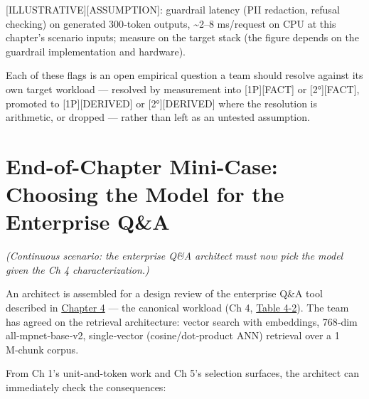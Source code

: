 \mbox{{[}ILLUSTRATIVE{]}}\hspace{0pt}\mbox{{[}ASSUMPTION{]}}: guardrail latency (PII redaction,
refusal checking) on generated 300‑token outputs, \textasciitilde2--8
ms/request on CPU at this chapter's scenario inputs; measure on the
target stack (the figure depends on the guardrail implementation and
hardware).

Each of these flags is an open empirical question a team should resolve
against its own target workload --- resolved by measurement into
\mbox{{[}1P{]}}\hspace{0pt}\mbox{{[}FACT{]}} or \mbox{{[}2°{]}}\hspace{0pt}\mbox{{[}FACT{]}}, promoted to
\mbox{{[}1P{]}}\hspace{0pt}\mbox{{[}DERIVED{]}} or \mbox{{[}2°{]}}\hspace{0pt}\mbox{{[}DERIVED{]}} where the resolution is
arithmetic, or dropped --- rather than left as an untested assumption.

\section{End-of-Chapter Mini-Case: Choosing the Model for the Enterprise
Q\&A}\label{end-of-chapter-mini-case-choosing-the-model-for-the-enterprise-qa}

\emph{(Continuous scenario: the enterprise Q\&A architect must now pick
the model given the Ch 4 characterization.)}

An architect is assembled for a design review of the enterprise Q\&A
tool described in \hyperref[chap:4]{Chapter 4} --- the canonical workload (Ch 4, \hyperref[tab:4.2]{Table 4-2}). The team has agreed on the retrieval architecture: vector search
with embeddings, 768‑dim all‑mpnet‑base‑v2, single‑vector
(cosine/dot‑product ANN) retrieval over a 1\,M‑chunk corpus.

From Ch 1's unit-and-token work and Ch 5's selection surfaces, the
architect can immediately check the consequences:

